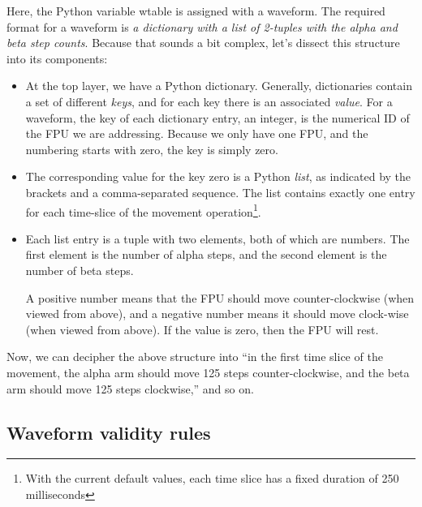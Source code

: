 \documentclass[fontsize=12,a4paper]{scrreprt}
\begin{document}
Here, the Python variable wtable is assigned with
a waveform. The required format for a waveform
is \emph{a dictionary with a list of 2-tuples
  with the alpha and beta step counts}. Because
that sounds a bit complex, let's dissect this
structure into its components:

\begin{itemize}

\item At the top layer, we have a Python dictionary. Generally,
  dictionaries contain a set of different \emph{keys}, and for each
  key there is an associated \emph{value}. For a waveform, the key of
  each dictionary entry, an integer, is the numerical ID of the FPU we
  are addressing.  Because we only have one FPU, and the numbering
  starts with zero, the key is simply zero.

\item The corresponding value for the key zero is a Python
  \emph{list}, as indicated by the brackets and a comma-separated
  sequence. The list contains exactly one entry for each time-slice of
  the movement operation\footnote{With the current default values,
    each time slice has a fixed duration of 250 milliseconds}.

\item Each list entry is a tuple with two elements, both of which are
  numbers. The first element is the number of alpha steps, and the
  second element is the number of beta steps.

  A positive number means that the FPU should move counter-clockwise
  (when viewed from above), and a negative number means it should move
  clock-wise (when viewed from above). If the value is zero, then the
  FPU will rest.

\end{itemize}

Now, we can decipher the above structure into ``in the first time
slice of the movement, the alpha arm should move 125 steps
counter-clockwise, and the beta arm should move 125 steps
clockwise,'' and so on.

\subsection{Waveform validity rules}
\label{sec:validity_rulesets}
\end{document}
